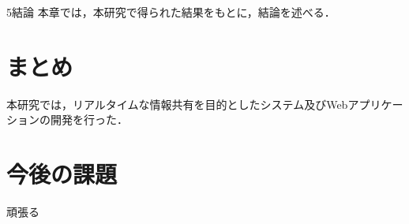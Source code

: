 \chapterhead
{5}{結論}
{本章では，本研究で得られた結果をもとに，結論を述べる．}

\section{まとめ}
本研究では，リアルタイムな情報共有を目的としたシステム及びWebアプリケーションの開発を行った．

\newpage

\section{今後の課題}
頑張る
